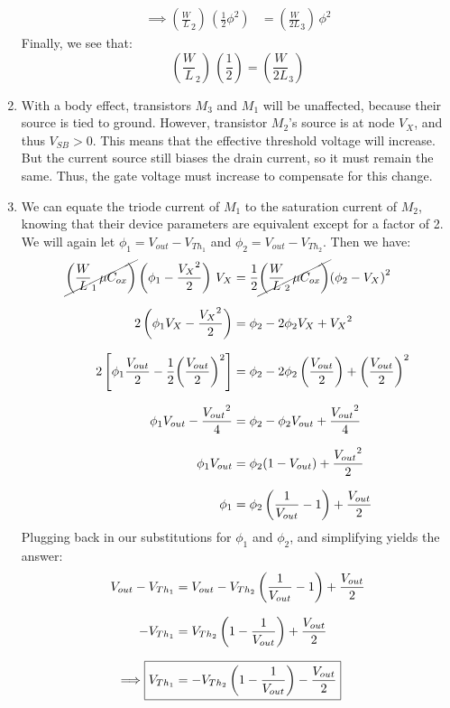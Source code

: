 \documentclass[12pt, fleqn]{article}
\begin{document}
\begin{enumerate}[label=(\alph*)]
{\begin{align}
            \implies \left({\frac{W}{L}}_2\right)\,\left(\frac{1}{2}\phi^2 \right) &= \left({\frac{W}{2L}}_3\right)\,\phi^2
        \end{align}
        Finally, we see that:
        \begin{equation}
            \boxed{\left({\frac{W}{L}}_2\right)\,\left(\frac{1}{2}\right) = \left({\frac{W}{2L}}_3\right)}
        \end{equation}
    }
    \item{With a body effect, transistors $M_3$ and $M_1$ will be unaffected, because their source is tied to ground.  However, transistor $M_2$'s source is at node $V_X$, and thus $V_{SB} > 0$.  This means that the effective threshold voltage will increase.  But the current source still biases the drain current, so it must remain the same.  Thus, the gate voltage must increase to compensate for this change.}
    \newpage
    \item
    {
    We can equate the triode current of $M_1$ to the saturation current of $M_2$, knowing that their device parameters are equivalent except for a factor of 2.  We will again let $\phi_1 = V_{out} - V_{{Th}_1}$ and $\phi_2 = V_{out} - V_{{Th}_2}$.  Then we have:
    \begin{align*}
        \cancel{\left({\frac{W}{L}}_1\,\mu C_{ox}\right)}\left(\phi_1 - \frac{{V_X}^2}{2}\right)\,V_X &= \frac{1}{2}\cancel{\left({\frac{W}{L}}_2\,\mu C_{ox}\right)}{(\phi_2 - V_X)}^2\\[0.25cm]
        2\left(\phi_1 V_X - \frac{{V_X}^2}{2}\right) &= \phi_2 - 2\phi_2 V_X + {V_X}^2\\[0.25cm]
        2\left[\phi_1 \frac{V_{out}}{2} - \frac{1}{2} {\left(\frac{V_{out}}{2}\right)}^2\right] &= \phi_2 - 2\phi_2\left(\frac{V_{out}}{2}\right) + {\left(\frac{V_{out}}{2}\right)}^2\\[0.25cm]
        \phi_1 V_{out} - \frac{{V_{out}}^2}{4} &= \phi_2 - \phi_2 V_{out} + \frac{{V_{out}}^2}{4}\\[0.25cm]
        \phi_1 V_{out} &= \phi_2(1 - V_{out}) + \frac{{V_{out}}^2}{2}\\[0.25cm]
        \phi_1 &= \phi_2\left(\frac{1}{V_{out}} - 1\right) + \frac{V_{out}}{2}
    \end{align*}
    Plugging back in our substitutions for $\phi_1$ and $\phi_2$, and simplifying yields the answer:
    \begin{align*}
        V_{out} - V_{{Th}_1} &= V_{out} - V_{{Th}_2}\left(\frac{1}{V_{out}} - 1\right) + \frac{V_{out}}{2}\\[0.25cm]
        -V_{{Th}_1} &= V_{{Th}_2}\left(1 - \frac{1}{V_{out}}\right) + \frac{V_{out}}{2}\\[0.25cm]
        \implies \Aboxed{V_{{Th}_1} &= -V_{{Th}_2}\left(1 - \frac{1}{V_{out}}\right) - \frac{V_{out}}{2}}
    \end{align*}
    }
\end{enumerate}
\end{document}
